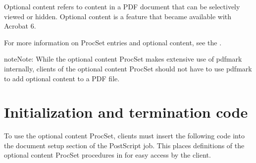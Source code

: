 \documentclass[letterpaper,12pt,english,openany,oneside]{sphinxmanual}
\begin{document}
Optional content refers to content in a PDF document that can be selectively viewed or hidden. Optional content is a feature that became available with Acrobat 6.

For more information on ProcSet entries and optional content, see the  .

\begin{sphinxadmonition}{note}{Note:}
While the optional content ProcSet makes extensive use of pdfmark internally, clients of the optional content ProcSet should not have to use pdfmark to add optional content to a PDF file.
\end{sphinxadmonition}


\section{Initialization and termination code}
\label{\detokenize{pdfmark_OC_Interface:initialization-and-termination-code}}
To use the optional content ProcSet, clients must insert the following code into the document setup section of the PostScript job. This places definitions of the optional content ProcSet procedures in  for easy access by the client.

\begin{sphinxVerbatim}[commandchars=\\\{\}]
    
   
        
       
        
         
       
         
         
          
        
\end{sphinxVerbatim}
\end{document}
